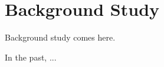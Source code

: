 %

\chapter{Background Study}

{
Background study comes here.
}

In the past, \cite{theimer89}...

\chapterend

